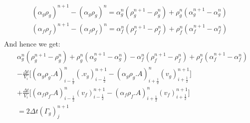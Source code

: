 \documentclass[11pt,letterpaper,titlepage]{article}
\newcommand{\half}{\frac{1}{2}}
\begin{document}
\begin{equation*}
\begin{aligned}
(\alpha_g \rho_g)^{n+1}-(\alpha_g \rho_g)^{n} = \alpha_g^n (\rho_g^{n+1}-\rho_g^n)+\rho_g^n(\alpha_g^{n+1}-\alpha_g^n)\\
(\alpha_f \rho_f)^{n+1}-(\alpha_f \rho_f)^{n} = \alpha_f^n (\rho_f^{n+1}-\rho_f^n)+\rho_f^n(\alpha_f^{n+1}-\alpha_f^n)\\
\end{aligned}
\end{equation*}
\newline
\noindent And hence we get:
\begin{equation} \label{eq:diffmass}
\begin{aligned}
&\alpha_g^n (\rho_g^{n+1}-\rho_g^n)+\rho_g^n(\alpha_g^{n+1}-\alpha_g^n)-\alpha_f^n (\rho_f^{n+1}-\rho_f^n)+\rho_f^n(\alpha_f^{n+1}-\alpha_f^n)\\
&-\frac{\Delta t}{V_i}\biggr[(\alpha_g\rho_g.A)_{i-\half}^{n} (.v_g)_{i-\half}^{n+1}
-(\alpha_g\rho_g.A)_{i+\half}^{n} (v_g)_{i+\half}^{n+1} \biggr]\\
&+ \frac{\Delta t}{V_i}\biggr[(\alpha_f\rho_f.A)_{i-\half}^{n} (v_f)_{i-\half}^{n+1}
-(\alpha_f\rho_f.A)_{i+\half}^{n} (v_f)_{i+\half}^{n+1} \biggr]\\
&=2\Delta t(\Gamma_g)_j^{n+1}
\end{aligned}
\end{equation}



\newpage
\end{document}
